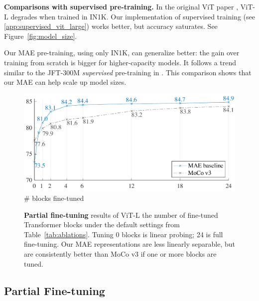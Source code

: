 \documentclass[10pt,twocolumn,letterpaper]{article}
\renewcommand{\paragraph}[1]{\vspace{1.25mm}\noindent\textbf{#1}}
\begin{document}
\paragraph{Comparisons with supervised pre-training.} In the original ViT paper \cite{Dosovitskiy2021}, ViT-L degrades when trained in IN1K. Our implementation of supervised training (see \ref{app:supervised_vit_large}) works better, but accuracy saturates. See Figure~\ref{fig:model_size}. 

Our MAE pre-training, using only IN1K, can generalize better: the gain over training from scratch is bigger for higher-capacity models. It follows a trend similar to the \mbox{JFT-300M} \textit{supervised} pre-training in \cite{Dosovitskiy2021}. This comparison shows that our MAE can help scale up model sizes.

\begin{figure}[t]\centering
\vspace{-.7em}
\includegraphics[width=.9\linewidth]{fig/partial_ft} \\
\vspace{-.5em}
{\scriptsize \# blocks fine-tuned} \\
\vspace{-.3em}
\caption{\textbf{Partial fine-tuning} results of ViT-L \wrt the number of fine-tuned Transformer blocks under the default settings from Table~\ref{tab:ablations}. Tuning 0 blocks is linear probing; 24 is full fine-tuning. Our MAE representations are less linearly separable, but are consistently better than MoCo v3 if one or more blocks are tuned.}
\label{fig:partial_ft} \vspace{-1em}
\end{figure}

\subsection{Partial Fine-tuning}
\label{sec:partial_ft}
\end{document}
